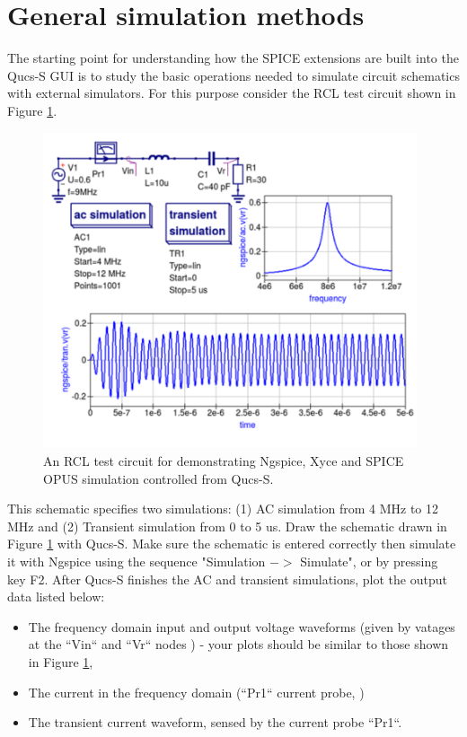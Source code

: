 \documentclass[10pt, a4paper]{report}
\begin{document}
\section{General simulation methods}
The starting point for understanding how the SPICE extensions are built into the Qucs-S GUI is to study the basic operations needed to simulate  circuit schematics with external simulators. For this purpose consider the RCL test circuit shown in Figure \ref{Fig8}.
\begin{figure}[h]
	\centering
	\includegraphics[width=11cm]{pics/chap2/RCL.pdf}
	\caption{An RCL test circuit for demonstrating Ngspice, Xyce and SPICE OPUS simulation controlled from Qucs-S.}
	\label{Fig8}
\end{figure}
This schematic specifies two simulations: (1) AC simulation from 4 MHz to 12 MHz and (2) Transient simulation from 0 to 5 us. Draw the schematic drawn in Figure \ref{Fig8} with Qucs-S.  Make sure the schematic is entered correctly then simulate it with Ngspice using the sequence "Simulation $->$ Simulate", or by pressing key F2. After Qucs-S finishes the AC and transient simulations, plot the output data listed below:
\begin{itemize}
	\item {The frequency domain input and output voltage waveforms (given by vatages at the ``Vin`` and ``Vr`` nodes ) - your plots should be similar to those shown in Figure \ref{Fig8}, }
	\item{The current in the frequency domain (``Pr1`` current probe, )}
	\item{The transient current waveform, sensed by the current probe ``Pr1``.}
\end{itemize}
\end{document}
